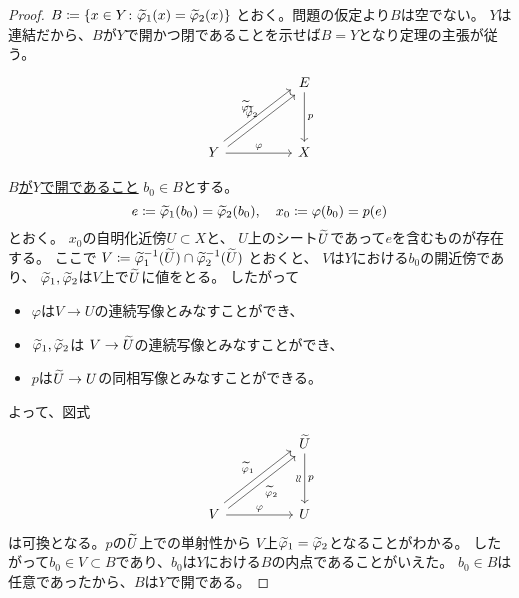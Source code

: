\documentclass[report]{jlreq}
\begin{document}
\begin{proof}
    $B \coloneqq \{ x \in Y \colon \widetilde{\varphi}_1(x) = \widetilde{\varphi}_2(x) \}$
    とおく。問題の仮定より$B$は空でない。
    $Y$は連結だから、$B$が$Y$で開かつ閉であることを示せば$B = Y$となり定理の主張が従う。
    \begin{equation}
        \begin{tikzcd}[row sep=huge, column sep=huge]
            & E
                \ar{d}{p} \\
            Y
                \ar[shift left]{ur}{\wt{\varphi}_1}
                \ar[shift right]{ur}{\wt{\varphi}_2}
                \ar{r}{\varphi}
                & X
        \end{tikzcd}
    \end{equation}

    \noindent
    \uline{$B$が$Y$で開であること} \quad
    $b_0 \in B$とする。
    \begin{equation}
        e \coloneqq \widetilde{\varphi}_1(b_0) = \widetilde{\varphi}_2(b_0),
        \quad
        x_0 \coloneqq \varphi(b_0) = p(e)
    \end{equation}
    とおく。
    $x_0$の自明化近傍$U \subset X$と、
    $U$上のシート$\widetilde{U}$であって$e$を含むものが存在する。
    ここで
    $V \coloneqq \widetilde{\varphi}_1^{-1}(\widetilde{U})
        \cap \widetilde{\varphi}_2^{-1}(\widetilde{U})$
    とおくと、
    $V$は$Y$における$b_0$の開近傍であり、
    $\widetilde{\varphi}_1, \widetilde{\varphi}_2$は$V$上で$\widetilde{U}$に値をとる。
    したがって
    \begin{itemize}
        \item $\varphi$は$V \to U$の連続写像とみなすことができ、
        \item $\widetilde{\varphi}_1, \widetilde{\varphi}_2$は
            $V \to \widetilde{U}$の連続写像とみなすことができ、
        \item $p$は$\widetilde{U} \to U$の同相写像とみなすことができる。
    \end{itemize}
    よって、図式
    \begin{equation}
        \begin{tikzcd}[row sep=huge, column sep=huge]
            & \wt{U} \ar{d}{p}[swap, anchor=center, rotate=90, yshift=1ex]{\approx} \\
            V \ar[shift left]{ur}{\wt{\varphi}_1}
                \ar[shift right]{ur}[swap]{\wt{\varphi}_2}
                \ar{r}{\varphi}
                & U
        \end{tikzcd}
    \end{equation}
    は可換となる。$p$の$\widetilde{U}$上での単射性から
    $V$上$\widetilde{\varphi}_1 = \widetilde{\varphi}_2$となることがわかる。
    したがって$b_0 \in V \subset B$であり、$b_0$は$Y$における$B$の内点であることがいえた。
    $b_0 \in B$は任意であったから、$B$は$Y$で開である。


\end{proof}
\end{document}
